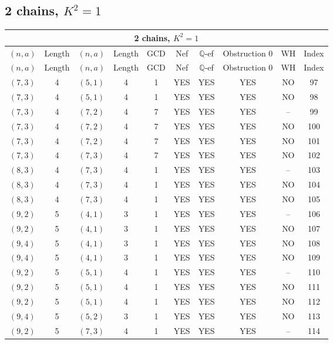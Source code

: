 \subsection{2 chains, $K^2 = 1$}
\begin{longtable}{|c|c|c|c|c|c|c|c|c|c|}
\hline
\multicolumn{10}{|c|}{2 chains, $K^2 = 1$}\\
\hline
$(n,a)$ & Length & $(n,a)$ & Length & GCD & Nef & $\mathbb Q$-ef & Obstruction 0 & WH & Index\\
\hline
\endfirsthead

\hline
$(n,a)$ & Length & $(n,a)$ & Length & GCD & Nef & $\mathbb Q$-ef & Obstruction 0 & WH & Index\\
\hline
\endhead
\hline
\endfoot

$(7, 3)$ & 4 & $(5, 1)$ & 4 & 1 & YES & YES & YES & NO & 97\\
$(7, 3)$ & 4 & $(5, 1)$ & 4 & 1 & YES & YES & YES & NO & 98\\
$(7, 3)$ & 4 & $(7, 2)$ & 4 & 7 & YES & YES & YES & -- & 99\\
$(7, 3)$ & 4 & $(7, 2)$ & 4 & 7 & YES & YES & YES & NO & 100\\
$(7, 3)$ & 4 & $(7, 2)$ & 4 & 7 & YES & YES & YES & NO & 101\\
$(7, 3)$ & 4 & $(7, 3)$ & 4 & 7 & YES & YES & YES & NO & 102\\
$(8, 3)$ & 4 & $(7, 3)$ & 4 & 1 & YES & YES & YES & -- & 103\\
$(8, 3)$ & 4 & $(7, 3)$ & 4 & 1 & YES & YES & YES & NO & 104\\
$(8, 3)$ & 4 & $(7, 3)$ & 4 & 1 & YES & YES & YES & NO & 105\\
$(9, 2)$ & 5 & $(4, 1)$ & 3 & 1 & YES & YES & YES & -- & 106\\
$(9, 2)$ & 5 & $(4, 1)$ & 3 & 1 & YES & YES & YES & NO & 107\\
$(9, 4)$ & 5 & $(4, 1)$ & 3 & 1 & YES & YES & YES & NO & 108\\
$(9, 4)$ & 5 & $(4, 1)$ & 3 & 1 & YES & YES & YES & NO & 109\\
$(9, 2)$ & 5 & $(5, 1)$ & 4 & 1 & YES & YES & YES & -- & 110\\
$(9, 2)$ & 5 & $(5, 1)$ & 4 & 1 & YES & YES & YES & NO & 111\\
$(9, 2)$ & 5 & $(5, 1)$ & 4 & 1 & YES & YES & YES & NO & 112\\
$(9, 4)$ & 5 & $(5, 2)$ & 3 & 1 & YES & YES & YES & NO & 113\\
$(9, 2)$ & 5 & $(7, 3)$ & 4 & 1 & YES & YES & YES & -- & 114\\

\end{longtable}
